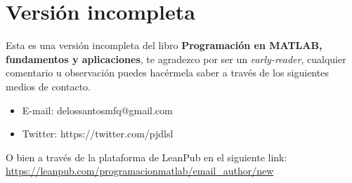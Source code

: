 \chapter*{Versión incompleta}

Esta es una versión incompleta del libro \textbf{Programación en MATLAB,
fundamentos y aplicaciones}, te agradezco por ser un
\emph{early-reader}, cualquier comentario u observación puedes hacérmela
saber a través de los siguientes medios de contacto.

\begin{itemize}
\item E-mail: delossantosmfq@gmail.com
\item Twitter: https://twitter.com/pjdlsl
\end{itemize}

O bien a través de la plataforma de LeanPub en el siguiente link: \\

\url{https://leanpub.com/programacionmatlab/email_author/new}